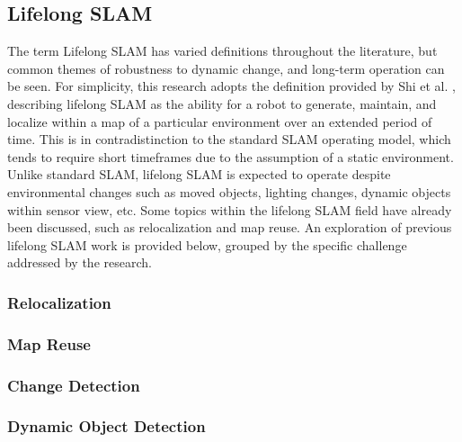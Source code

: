\subsection{Lifelong SLAM}

The term Lifelong SLAM has varied definitions throughout the literature, but common themes of robustness to dynamic change, and long-term operation can be seen. For simplicity, this research adopts the definition provided by Shi et al. \cite{shiAreWeReady2020}, describing lifelong SLAM as the ability for a robot to generate, maintain, and localize within a map of a particular environment over an extended period of time. This is in contradistinction to the standard SLAM operating model, which tends to require short timeframes due to the assumption of a static environment. Unlike standard SLAM, lifelong SLAM is expected to operate despite environmental changes such as moved objects, lighting changes, dynamic objects within sensor view, etc. Some topics within the lifelong SLAM field have already been discussed, such as relocalization and map reuse. An exploration of previous lifelong SLAM work is provided below, grouped by the specific challenge addressed by the research.

\subsubsection{Relocalization}
\subsubsection{Map Reuse}
\subsubsection{Change Detection}
\subsubsection{Dynamic Object Detection}
